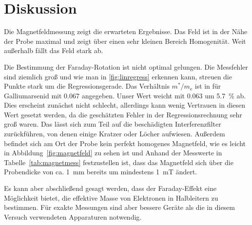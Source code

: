 
\section{Diskussion}
Die Magnetfeldmessung zeigt die erwarteten Ergebnisse. Das Feld ist in
der Nähe der Probe maximal und zeigt über einen sehr kleinen Bereich
Homogenität.  Weit außerhalb fällt das Feld stark ab.

Die Bestimmung der Faraday-Rotation ist nicht optimal gelungen.  Die
Messfehler sind ziemlich groß und wie man in \cref{fig:linregress}
erkennen kann, streuen die Punkte stark um die Regressionsgerade. Das
Verhältnis $m^*/m_\text{e}$ ist in \cite{ecee-colorado} für
Galliumarsenid mit \num{0.067} angegeben.  Unser Wert weicht mit
\num{0.063} um \SI{5.7}{\percent} ab.  Dies erscheint zunächst nicht
schlecht, allerdings kann wenig Vertrauen in diesen Wert gesetzt werden,
da die geschätzten Fehler in der Regressionsrechnung sehr groß waren.
Das lässt sich zum Teil auf die beschädigten Interferenzfilter
zurückführen, von denen einige Kratzer oder Löcher aufwiesen. Außerdem
befindet sich am Ort der Probe kein perfekt homogenes Magnetfeld, wie es
leicht in Abbildung~\ref{fig:magnetfeld} zu sehen ist und Anhand der
Messwerte in Tabelle~\ref{tab:magnetmess} festzustellen ist, dass das
Magnetfeld sich über die Probendicke von ca. \SI{1}{\milli\metre}
bereits um mindestens \SI{1}{\milli\tesla} ändert.

Es kann aber abschließend gesagt werden, dass der Faraday-Effekt 
eine Möglichkeit bietet, die effektive Masse von Elektronen in 
Halbleitern zu bestimmen. Für exakte Messungen sind aber 
bessere Geräte als die in diesem Versuch verwendeten Apparaturen 
notwendig. 
